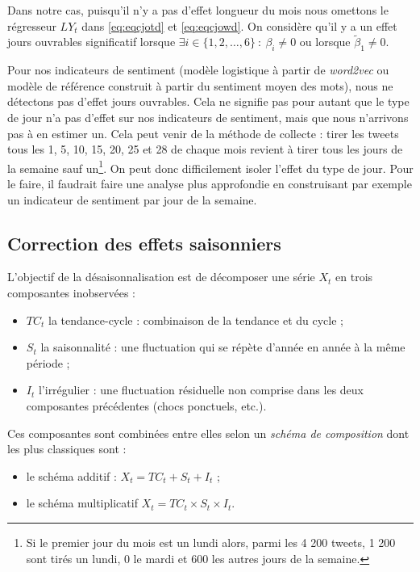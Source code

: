 \documentclass[11pt,french,french]{article}
\let\rmarkdownfootnote\footnote%
\def\footnote{\protect\rmarkdownfootnote}
\begin{document}
Dans notre cas, puisqu'il n'y a pas d'effet longueur du mois nous omettons le régresseur \(LY_t\) dans \eqref{eq:eqcjotd} et \eqref{eq:eqcjowd}. On considère qu'il y a un effet jours ouvrables significatif lorsque \(\exists i\in \{1,2,\dots,6\}\::\:\beta_i\ne0\) ou lorsque \(\tilde\beta_1\ne0\).

\faArrowCircleRight{} Pour nos indicateurs de sentiment (modèle logistique à partir de \emph{word2vec} ou modèle de référence construit à partir du sentiment moyen des mots), nous ne détectons pas d'effet jours ouvrables.
Cela ne signifie pas pour autant que le type de jour n'a pas d'effet sur nos indicateurs de sentiment, mais que nous n'arrivons pas à en estimer un.
Cela peut venir de la méthode de collecte : tirer les tweets tous les 1, 5, 10, 15, 20, 25 et 28 de chaque mois revient à tirer tous les jours de la semaine sauf un\footnote{Si le premier jour du mois est un lundi alors, parmi les 4 200 tweets, 1 200 sont tirés un lundi, 0 le mardi et 600 les autres jours de la semaine.}.
On peut donc difficilement isoler l'effet du type de jour. Pour le faire, il faudrait faire une analyse plus approfondie en construisant par exemple un indicateur de sentiment par jour de la semaine.

\hypertarget{sec:cvs}{%
\subsection{Correction des effets saisonniers}\label{sec:cvs}}

L'objectif de la désaisonnalisation est de décomposer une série \(X_t\) en trois composantes inobservées :

\begin{itemize}
\item
  \(TC_t\) la tendance-cycle : combinaison de la tendance et du cycle ;
\item
  \(S_t\) la saisonnalité : une fluctuation qui se répète d'année en année à la même période ;
\item
  \(I_t\) l'irrégulier : une fluctuation résiduelle non comprise dans les deux composantes précédentes (chocs ponctuels, etc.).
\end{itemize}

Ces composantes sont combinées entre elles selon un \emph{schéma de composition} dont les plus classiques sont :

\begin{itemize}
\item
  le schéma additif : \(X_t=TC_t+S_t+I_t\) ;
\item
  le schéma multiplicatif \(X_t=TC_t\times S_t\times I_t\).
\end{itemize}
\end{document}
